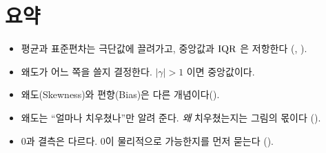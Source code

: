 \section{요약}

\begin{itemize}
  \item 평균과 표준편차는 극단값에 끌려가고, 중앙값과 $\mathrm{IQR}$ 은 저항한다
        (, ).
  \item 왜도가 어느 쪽을 쓸지 결정한다. $|\gamma| > 1$ 이면 중앙값이다.
  \item 왜도(Skewness)와 편향(Bias)은 다른 개념이다().
  \item 왜도는 ``얼마나 치우쳤나''만 알려 준다. \emph{왜} 치우쳤는지는 그림의 몫이다
        ().
  \item 0과 결측은 다르다. 0이 물리적으로 가능한지를 먼저 묻는다
        ().
\end{itemize}
